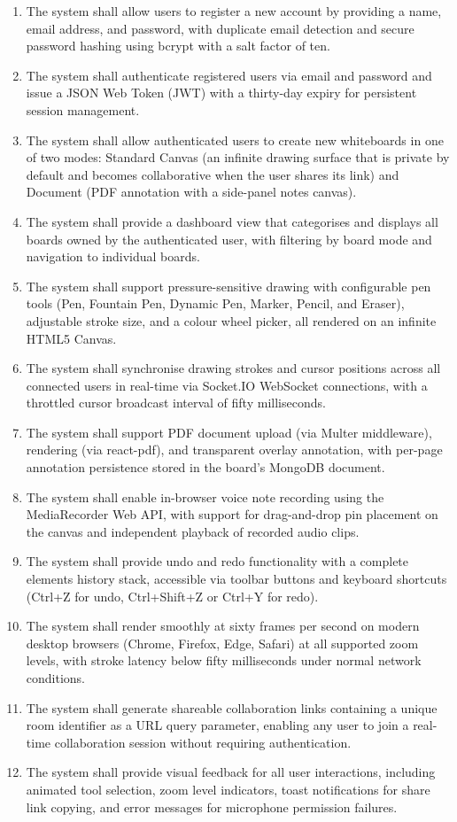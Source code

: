 \documentclass[12pt,a4paper]{report}
\begin{document}
\begin{enumerate}[label=\arabic*.]
  \item The system shall allow users to register a new account by providing a name, email address, and password, with duplicate email detection and secure password hashing using bcrypt with a salt factor of ten.
  \item The system shall authenticate registered users via email and password and issue a JSON Web Token (JWT) with a thirty-day expiry for persistent session management.
  \item The system shall allow authenticated users to create new whiteboards in one of two modes: Standard Canvas (an infinite drawing surface that is private by default and becomes collaborative when the user shares its link) and Document (PDF annotation with a side-panel notes canvas).
  \item The system shall provide a dashboard view that categorises and displays all boards owned by the authenticated user, with filtering by board mode and navigation to individual boards.
  \item The system shall support pressure-sensitive drawing with configurable pen tools (Pen, Fountain Pen, Dynamic Pen, Marker, Pencil, and Eraser), adjustable stroke size, and a colour wheel picker, all rendered on an infinite HTML5 Canvas.
  \item The system shall synchronise drawing strokes and cursor positions across all connected users in real-time via Socket.IO WebSocket connections, with a throttled cursor broadcast interval of fifty milliseconds.
  \item The system shall support PDF document upload (via Multer middleware), rendering (via react-pdf), and transparent overlay annotation, with per-page annotation persistence stored in the board's MongoDB document.
  \item The system shall enable in-browser voice note recording using the MediaRecorder Web API, with support for drag-and-drop pin placement on the canvas and independent playback of recorded audio clips.
  \item The system shall provide undo and redo functionality with a complete elements history stack, accessible via toolbar buttons and keyboard shortcuts (Ctrl+Z for undo, Ctrl+Shift+Z or Ctrl+Y for redo).
  \item The system shall render smoothly at sixty frames per second on modern desktop browsers (Chrome, Firefox, Edge, Safari) at all supported zoom levels, with stroke latency below fifty milliseconds under normal network conditions.
  \item The system shall generate shareable collaboration links containing a unique room identifier as a URL query parameter, enabling any user to join a real-time collaboration session without requiring authentication.
  \item The system shall provide visual feedback for all user interactions, including animated tool selection, zoom level indicators, toast notifications for share link copying, and error messages for microphone permission failures.
\end{enumerate}
\end{document}
